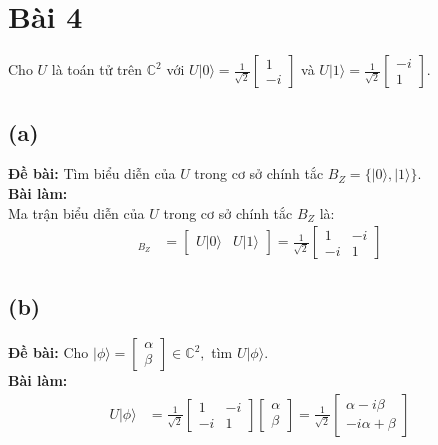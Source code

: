 \section{Bài 4}
Cho $U$ là toán tử trên $\mathbb{C}^{2}$ với $U|0\rangle=\frac{1}{\sqrt{2}}\begin{bmatrix}1\\ -i\end{bmatrix}$ và $U|1\rangle=\frac{1}{\sqrt{2}}\begin{bmatrix}-i\\ 1\end{bmatrix}$.

\subsection{(a)}
\textbf{Đề bài:} Tìm biểu diễn của $U$ trong cơ sở chính tắc $B_{Z}=\{|0\rangle,|1\rangle\}$.\\
\textbf{Bài làm:}\\
Ma trận biểu diễn của $U$ trong cơ sở chính tắc $B_{Z}$ là:
\begin{align*}
    [U]_{B_{Z}} &= \begin{bmatrix}
        U|0\rangle & U|1\rangle
    \end{bmatrix} = \frac{1}{\sqrt{2}}\begin{bmatrix}
        1 & -i \\
        -i & 1
    \end{bmatrix}
\end{align*}

\subsection{(b)}
\textbf{Đề bài:} Cho $|\phi\rangle=\begin{bmatrix}\alpha\\ \beta\end{bmatrix}\in\mathbb{C}^{2},$ tìm $U|\phi\rangle$.\\
\textbf{Bài làm:}
\begin{align*}
    U|\phi\rangle &= \frac{1}{\sqrt{2}}\begin{bmatrix}
        1 & -i \\
        -i & 1
    \end{bmatrix}
    \begin{bmatrix}
        \alpha\\\beta
    \end{bmatrix}
    = \frac{1}{\sqrt{2}}\begin{bmatrix}
        \alpha - i\beta \\
        -i\alpha + \beta
    \end{bmatrix}
\end{align*}

